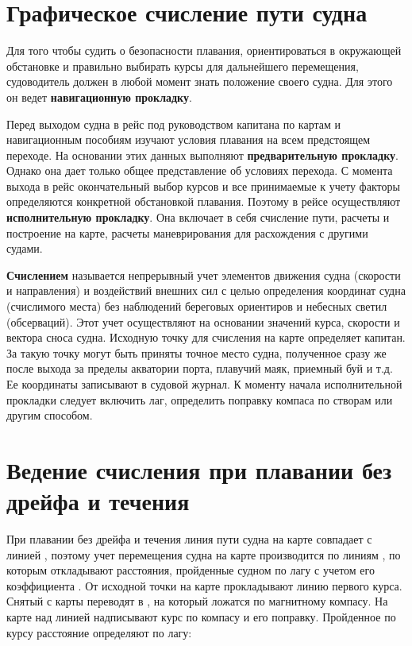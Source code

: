 \section{Графическое счисление пути судна}

Для того чтобы судить о безопасности плавания, ориентироваться в окружающей обстановке и правильно выбирать курсы для дальнейшего перемещения, судоводитель должен в любой момент знать положение своего судна. Для этого он ведет \textbf{навигационную прокладку}. 

Перед выходом судна в рейс под руководством капитана по картам и навигационным пособиям изучают условия плавания на всем предстоящем переходе. На основании этих данных выполняют \textbf{предварительную прокладку}. Однако она дает только общее представление об условиях перехода. С момента выхода в рейс окончательный выбор курсов и все принимаемые к учету факторы определяются конкретной обстановкой плавания. Поэтому в рейсе осуществляют \textbf{исполнительную прокладку}. Она включает в себя счисление пути, расчеты и построение на карте, расчеты маневрирования для расхождения с другими судами. 

\textbf{Счислением} называется непрерывный учет элементов движения судна (скорости и направления) и воздействий внешних сил с целью определения координат судна (счислимого места) без наблюдений береговых ориентиров и небесных светил (обсерваций). Этот учет осуществляют на основании значений курса, скорости и вектора сноса судна. Исходную точку для счисления на карте определяет капитан. За такую точку могут быть приняты точное место судна, полученное сразу же после выхода за пределы акватории порта, плавучий маяк, приемный буй и т.д. Ее координаты записывают в судовой журнал. К моменту начала исполнительной прокладки следует включить лаг, определить поправку компаса по створам или другим способом. 

\section{Ведение счисления при плавании без дрейфа и течения}

При плавании без дрейфа и течения линия пути судна на карте совпадает с линией \IK, поэтому учет перемещения судна на карте производится по линиям \IK, по которым откладывают расстояния, пройденные судном по лагу с учетом его коэффициента . От исходной точки на карте прокладывают линию первого курса. Снятый с карты \IK переводят в \KK, на который ложатся по магнитному компасу. На карте над линией \IK надписывают курс по компасу и его поправку. Пройденное по курсу расстояние  определяют по лагу: 

